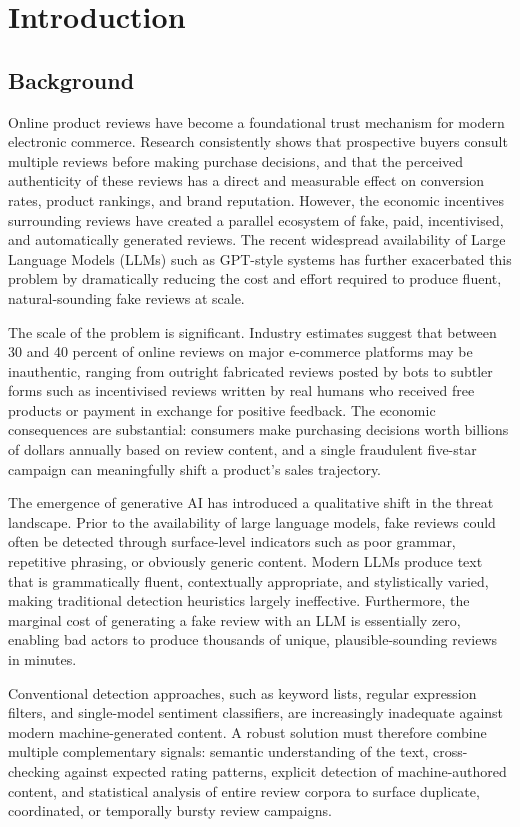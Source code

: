\documentclass[12pt,a4paper,oneside]{report}
\begin{document}
\chapter{Introduction}

\section{Background}
Online product reviews have become a foundational trust mechanism for
modern electronic commerce. Research consistently shows that prospective
buyers consult multiple reviews before making purchase decisions, and that
the perceived authenticity of these reviews has a direct and measurable
effect on conversion rates, product rankings, and brand reputation.
However, the economic incentives surrounding reviews have created a
parallel ecosystem of fake, paid, incentivised, and automatically generated
reviews. The recent widespread availability of Large Language Models (LLMs)
such as GPT-style systems has further exacerbated this problem by
dramatically reducing the cost and effort required to produce fluent,
natural-sounding fake reviews at scale.

The scale of the problem is significant. Industry estimates suggest that
between 30 and 40 percent of online reviews on major e-commerce platforms
may be inauthentic, ranging from outright fabricated reviews posted by bots
to subtler forms such as incentivised reviews written by real humans who
received free products or payment in exchange for positive feedback. The
economic consequences are substantial: consumers make purchasing decisions
worth billions of dollars annually based on review content, and a single
fraudulent five-star campaign can meaningfully shift a product's sales
trajectory.

The emergence of generative AI has introduced a qualitative shift in the
threat landscape. Prior to the availability of large language models, fake
reviews could often be detected through surface-level indicators such as
poor grammar, repetitive phrasing, or obviously generic content. Modern
LLMs produce text that is grammatically fluent, contextually appropriate,
and stylistically varied, making traditional detection heuristics largely
ineffective. Furthermore, the marginal cost of generating a fake review
with an LLM is essentially zero, enabling bad actors to produce thousands
of unique, plausible-sounding reviews in minutes.

Conventional detection approaches, such as keyword lists, regular
expression filters, and single-model sentiment classifiers, are
increasingly inadequate against modern machine-generated content. A robust solution
must therefore combine multiple complementary signals: semantic
understanding of the text, cross-checking against expected rating
patterns, explicit detection of machine-authored content, and statistical
analysis of entire review corpora to surface duplicate, coordinated, or
temporally bursty review campaigns.
\end{document}
